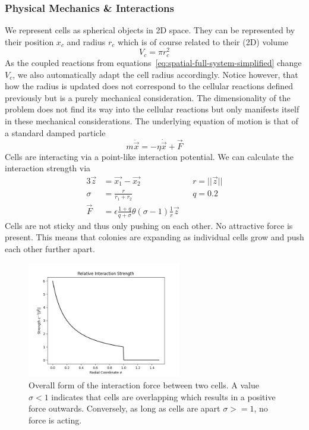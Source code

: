 \documentclass[10pt,A4paper]{article}
\numberwithin{equation}{section}
\begin{document}
\subsubsection{Physical Mechanics \& Interactions}
We represent cells as spherical objects in 2D space.
They can be represented by their position $x_c$ and radius $r_c$ which is of course related to their (2D) volume
\begin{equation}
    V_c = \pi r_c^2
\end{equation}
As the coupled reactions from equations~\eqref{eq:spatial-full-system-simplified} change $V_c$, we also automatically adapt the cell radius accordingly.
Notice however, that how the radius is updated does not correspond to the cellular reactions defined previously but is a purely mechanical consideration.
The dimensionality of the problem does not find its way into the cellular reactions but only manifests itself in these mechanical considerations.
The underlying equation of motion is that of a standard damped particle
\begin{equation}
    m \ddot{\vec{x}} = -\eta\dot{\vec{x}} + \vec{F}
\end{equation}
Cells are interacting via a point-like interaction potential.
We can calculate the interaction strength via
\begin{alignat}{3}
    \vec{z} &= \vec{x_1} - \vec{x_2} \hspace{2em}&& r = ||\vec{z}||\\
    \sigma &= \frac{r}{r_1+r_2} && q=0.2\\
    \vec{F} &= \epsilon \frac{1+q}{q+\sigma} \theta(\sigma - 1) \frac{1}{r}\vec{z}
\end{alignat}
Cells are not sticky and thus only pushing on each other.
No attractive force is present.
This means that colonies are expanding as individual cells grow and push each other further apart.
%
\begin{figure}
    \centering
    \includegraphics[width=0.6\textwidth]{Figures/interaciton_potential.png}
    \caption{
        Overall form of the interaction force between two cells.
        A value $\sigma<1$ indicates that cells are overlapping which results in a positive force outwards.
        Conversely, as long as cells are apart $\sigma>=1$, no force is acting.
    }
    \label{fig:spatial-interaction-potential}
\end{figure}
%
%
\end{document}
